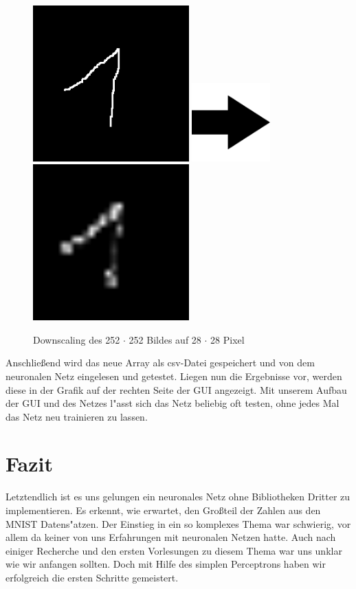 \documentclass[12pt,a4paper]{scrartcl}
\begin{document}
\begin{figure}[h]
	\centering
	\includegraphics[width=6cm]{screens/BILD252x252.png}  \hfill
	\includegraphics[width=3cm]{screens/arrow.png} \hfill
	\includegraphics[width=6cm]{screens/BILD28x28.png}
	\caption{Downscaling des 252 $\cdot$ 252 Bildes auf 28 $\cdot$ 28 Pixel} \label{28x28}
\end{figure}


Anschlie\ss end wird das neue Array als csv-Datei gespeichert und von dem neuronalen Netz eingelesen und getestet. Liegen nun die Ergebnisse vor, werden diese in der Grafik auf der rechten Seite der GUI angezeigt. Mit unserem Aufbau der GUI und des Netzes l"asst sich das Netz beliebig oft testen, ohne jedes Mal das Netz neu trainieren zu lassen.

\pagebreak

\section{Fazit}

Letztendlich ist es uns gelungen ein neuronales Netz ohne Bibliotheken Dritter zu implementieren. Es erkennt, wie erwartet, den Gro\ss teil der Zahlen aus den MNIST Datens"atzen. Der Einstieg in ein so komplexes Thema war schwierig, vor allem da keiner von uns Erfahrungen mit neuronalen Netzen hatte. Auch nach einiger Recherche und den ersten Vorlesungen zu diesem Thema war uns unklar wie wir anfangen sollten. Doch mit Hilfe des simplen Perceptrons haben wir erfolgreich die ersten Schritte gemeistert.\\
\end{document}
